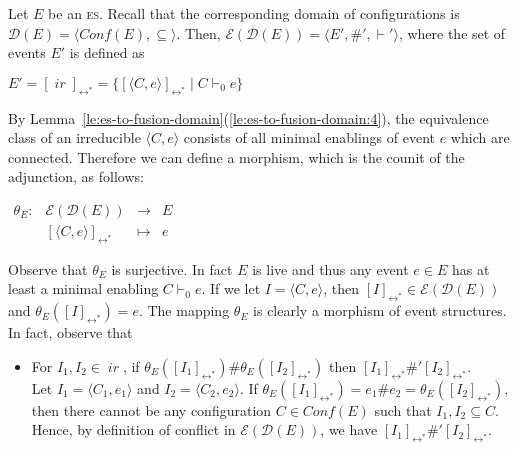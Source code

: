 \documentclass[conference]{IEEEtran}
\renewenvironment{proof}{\begin{IEEEproof}}{\end{IEEEproof}}
\newcommand{\ir}[1]{\ensuremath{\mathop{\mathit{ir}({#1})}}}
\newcommand{\esabbr}{\textsc{es}}
\newcommand{\esir}[2]{\ensuremath{\langle{#1}, {#2}\rangle}}
\newcommand{\eqclass}[2][]{\ensuremath{[{#2}]_{\scriptscriptstyle {#1}}}}
\newcommand{\eqclassir}[1]{\ensuremath{\eqclass[\leftrightarrow^*]{#1}}}
\newcommand{\zev}[0]{\ensuremath{\mathcal{E}}}
\newcommand{\ev}[1]{\ensuremath{\zev({#1})}}
\newcommand{\conf}[1]{\ensuremath{\mathit{Conf}({#1})}}
\newcommand{\zdom}[0]{\ensuremath{\mathcal{D}}}
\newcommand{\dom}[1]{\ensuremath{\zdom({#1})}}
\begin{document}
\begin{proof}
  Let ${E}$ be an {\esabbr}. Recall that the corresponding domain of
  configurations is
  $\dom{{E}} = \langle \conf{{E}}, \subseteq \rangle$.  Then,
  $\ev{\dom{{E}}} = \langle E', \#', \vdash'\rangle$, where the set of
  events $E'$ is defined as
  \begin{center}
    $E' = \eqclassir{\ir{\dom{{E}}}} = \{ \eqclassir{\esir{C}{e}} \mid C
    \vdash_0 e \}$
  \end{center}
  
  By
  Lemma~\ref{le:es-to-fusion-domain}(\ref{le:es-to-fusion-domain:4}),
  the equivalence class of an irreducible $\esir{C}{e}$ consists of
  all minimal enablings of event $e$ which are connected. Therefore we
  can define a morphism, which is the counit of the adjunction, as follows:
  \begin{center}
    $\begin{array}{lccc}
       \theta_{{E}} : & \ev{\dom{{E}}} &  \to & {E}\\
                             & \eqclassir{\esir{C}{e}}
                             & \mapsto & e
     \end{array}
     $
  \end{center}
  Observe that $\theta_{{E}}$ is surjective. In fact ${E}$ is live and
  thus any event $e \in E$ has at least a minimal enabling
  $C \vdash_0 e$. If we let $I = \esir{C}{e}$, then
  $\eqclassir{I} \in \ev{\dom{{E}}}$ and $\theta_{{E}}(\eqclassir{I}) = e$.
  The mapping $\theta_E$ is clearly
  a  morphism of event structures. In fact, observe that
  \begin{itemize}
  
  \item For 
  $I_1, I_2 \in \ir{\dom{{E}}}$, if
    $\theta_{{E}}(\eqclassir{I_1}) \#
    \theta_{{E}}(\eqclassir{I_2})$
    then $\eqclassir{I_1} \#' \eqclassir{I_2}$.\\
    Let $I_1 = \esir{C_1}{e_1}$ and $I_2 = \esir{C_2}{e_2}$. If
    $\theta_{{E}}(\eqclassir{I_1}) = e_1 \# e_2 =
    \theta_{{E}}(\eqclassir{I_2})$, then there cannot be any
    configuration $C \in \conf{{E}}$ such that $I_1, I_2 \subseteq
    C$. Hence, by definition of conflict in $\ev{\dom{{E}}}$, we have
    $\eqclassir{I_1} \#' \eqclassir{I_2}$.


\end{itemize}
\end{proof}
\end{document}
